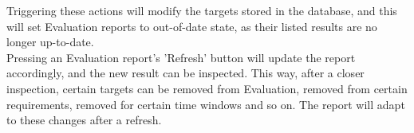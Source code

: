 Triggering these actions will modify the targets stored in the database,
and this will set Evaluation reports to out-of-date state, as their listed results are no longer up-to-date. \\

Pressing an Evaluation report's 'Refresh' button will update the report accordingly,
and the new result can be inspected. This way, after a closer inspection, certain targets can be removed from Evaluation, 
removed from certain requirements, removed for certain time windows and so on.
The report will adapt to these changes after a refresh.

